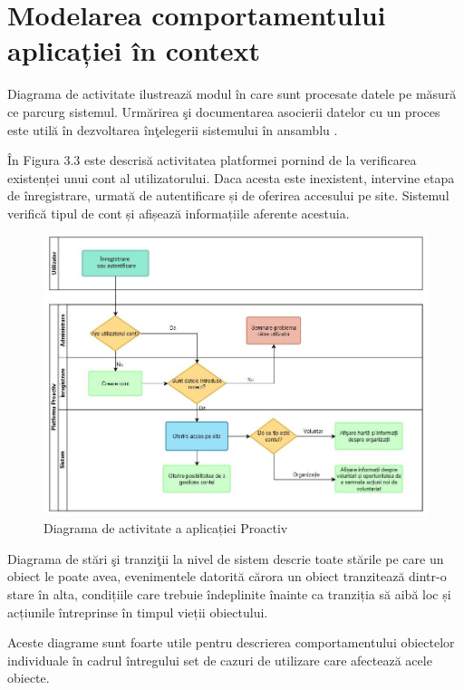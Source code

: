 \documentclass[12pt,a4paper]{report}
\begin{document}
\section{Modelarea comportamentului aplicației în context}
\par
Diagrama de activitate ilustrează modul în care sunt procesate datele pe măsură ce parcurg sistemul. Urmărirea şi documentarea asocierii datelor cu un proces este utilă în dezvoltarea înţelegerii sistemului în ansamblu \cite{uml}.
\\
\par
În Figura 3.3 este descrisă activitatea platformei pornind de la verificarea existenței unui cont al utilizatorului. Daca acesta este inexistent, intervine etapa de înregistrare, urmată de autentificare și de oferirea accesului pe site. Sistemul verifică tipul de cont și afișează informațiile aferente acestuia.
\\
\begin{figure}[h!]
\centering
  \includegraphics[width=1\linewidth]{./imagini/swimlane.JPG}
  \caption{Diagrama de activitate a aplicației Proactiv}
\end{figure}

\newpage
\par
Diagrama de stări şi tranziţii la nivel de sistem descrie toate stările pe care un obiect le poate avea, evenimentele datorită cărora un obiect tranzitează dintr-o stare în alta, condițiile care trebuie îndeplinite înainte ca tranziția să aibă loc și acțiunile întreprinse în timpul vieții obiectului.
\par
Aceste diagrame sunt foarte utile pentru descrierea comportamentului obiectelor individuale în cadrul întregului set de cazuri de utilizare care afectează acele obiecte.
\end{document}
